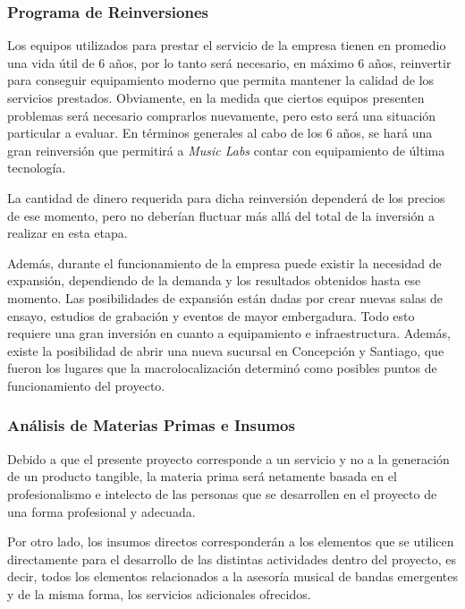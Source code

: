 \subsubsection{Programa de Reinversiones}

Los equipos utilizados para prestar el servicio
de la empresa tienen en promedio una vida
útil de 6 años, por lo tanto será necesario,
en máximo 6 años, reinvertir para conseguir
equipamiento moderno que permita
mantener la calidad de los servicios prestados.
Obviamente, en la medida que ciertos
equipos presenten problemas será necesario
comprarlos nuevamente, pero esto será una situación
particular a evaluar. En términos generales
al cabo de los 6 años, se hará una gran reinversión
que permitirá a \emph{Music Labs} contar con equipamiento
de última tecnología.

La cantidad de dinero requerida para dicha reinversión
dependerá de los precios de ese momento, pero
no deberían fluctuar más allá del total de
la inversión a realizar en esta etapa.

Además, durante el funcionamiento de la empresa
puede existir la necesidad de expansión, dependiendo
de la demanda y los resultados obtenidos hasta ese 
momento. Las posibilidades de expansión están
dadas por crear nuevas salas de ensayo, estudios de 
grabación y eventos de mayor embergadura. Todo esto
requiere una gran inversión en cuanto a equipamiento
e infraestructura. Además, existe la posibilidad
de abrir una nueva sucursal en Concepción y Santiago, que
fueron los lugares que la macrolocalización determinó
como posibles puntos de funcionamiento del proyecto.


\subsubsection{Análisis de Materias Primas e Insumos}

Debido a que el presente proyecto corresponde a un servicio
y no a la generación de un producto tangible, la materia prima
será netamente basada en el profesionalismo e intelecto de las
personas que se desarrollen en el proyecto de una forma
profesional y adecuada.

Por otro lado, los insumos directos corresponderán a los elementos 
que se utilicen directamente para el desarrollo de las distintas
actividades dentro del proyecto, es decir, todos los elementos
relacionados a la asesoría musical de bandas emergentes y
de la misma forma, los servicios adicionales ofrecidos.

